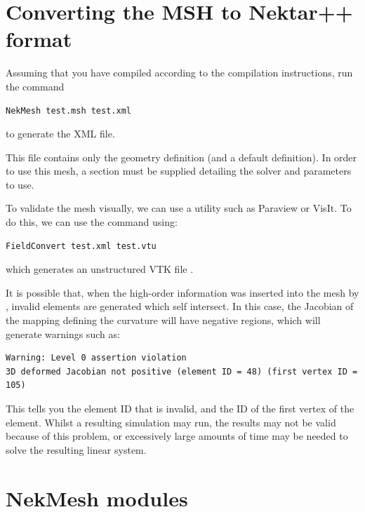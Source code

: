 \section{Converting the MSH to Nektar++ format}
Assuming that you have compiled \nekpp according to the compilation
instructions, run the command
%
\begin{lstlisting}[style=BashInputStyle]
NekMesh test.msh test.xml
\end{lstlisting}
%
to generate the XML file.
%
\begin{notebox}
  This file contains only the geometry definition (and a default
   definition). In order to use this mesh, a
   section must be supplied detailing the solver and
  parameters to use.
\end{notebox}
%
To validate the mesh visually, we can use a utility such as Paraview or
VisIt. To do this, we can use the  command using:
%
\begin{lstlisting}[style=BashInputStyle]
FieldConvert test.xml test.vtu
\end{lstlisting}
%
which generates an unstructured VTK file .

It is possible that, when the high-order information was inserted into the mesh
by \gmsh, invalid elements are generated which self intersect. In this case, the
Jacobian of the mapping defining the curvature will have negative regions, which
will generate warnings such as:
\begin{lstlisting}[style=BashInputStyle]
Warning: Level 0 assertion violation
3D deformed Jacobian not positive (element ID = 48) (first vertex ID = 105)
\end{lstlisting}
This tells you the element ID that is invalid, and the ID of the first vertex of
the element. Whilst a resulting simulation may run, the results may not be valid
because of this problem, or excessively large amounts of time may be needed to
solve the resulting linear system.

\section{NekMesh modules}


